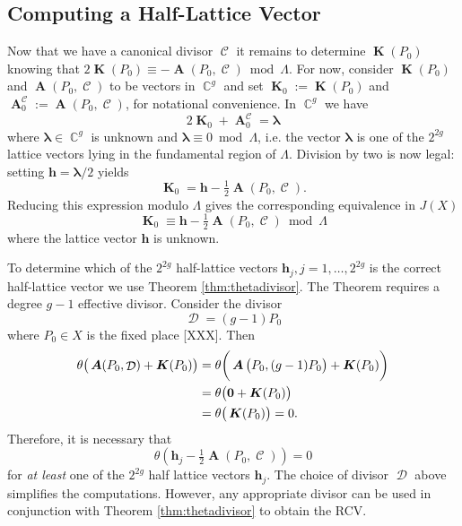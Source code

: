 \documentclass[12pt]{article}
\theoremstyle{definition}
\DeclareMathOperator{\CC}{\mathbb{C}}
\DeclareMathOperator{\DivC}{\mathcal{C}}
\DeclareMathOperator{\DivD}{\mathcal{D}}
\DeclareMathOperator{\RCV}{\boldsymbol{K}}
\DeclareMathOperator{\Abel}{\boldsymbol{A}}
\begin{document}
\subsection{Computing a Half-Lattice Vector}


Now that we have a canonical divisor $\DivC$ it remains to determine
$\RCV(P_0)$ knowing that $2\RCV(P_0) \equiv - \Abel(P_0,\DivC)
\bmod{\Lambda}$. For now, consider $\RCV(P_0)$ and $\Abel(P_0,\DivC)$ to
be vectors in $\CC^g$ and set $\RCV_0 := \RCV(P_0)$ and $\Abel_0^{\DivC}
:= \Abel(P_0,\DivC)$, for notational convenience. In $\CC^g$ we have
\begin{equation}
2\RCV_0 + \Abel_0^{\DivC} = \boldsymbol{\lambda}
\end{equation}
where $\boldsymbol{\lambda} \in \CC^g$ is unknown and
$\boldsymbol{\lambda} \equiv 0 \bmod{\Lambda}$, i.e. the vector
$\boldsymbol{\lambda}$ is one of the $2^{2g}$ lattice vectors lying in
the fundamental region of $\Lambda$. Division by two is now legal:
setting $\boldsymbol{h} = \boldsymbol{\lambda}/2$ yields
\begin{equation}
\RCV_0 = \boldsymbol{h} - \tfrac{1}{2} \Abel(P_0,\DivC).
\end{equation}
Reducing this expression modulo $\Lambda$ gives the corresponding
equivalence in $J(X)$
\begin{equation}
\RCV_0 \equiv \boldsymbol{h} - \tfrac{1}{2} \Abel(P_0,\DivC)
\bmod{\Lambda}
\end{equation}
where the lattice vector $\boldsymbol{h}$ is unknown.

To determine which of the $2^{2g}$ half-lattice vectors
$\boldsymbol{h}_j, j = 1, \ldots, 2^{2g}$ is the correct half-lattice
vector we use Theorem \ref{thm:thetadivisor}. The Theorem requires a
degree $g-1$ effective divisor. Consider the divisor
\begin{equation} \label{eqn:simple-effective-divisor}
  \DivD = (g-1)P_0
\end{equation}
where $P_0 \in X$ is the fixed place [XXX]. Then
\begin{align*}
  \theta\big(\Abel(P_0,\DivD) + \RCV(P_0)\big)
  &=
  \theta\bigg(\Abel\big(P_0,(g-1)P_0\big) + \RCV(P_0)\bigg) \notag \\
  &=
  \theta\big(\boldsymbol{0} + \RCV(P_0)\big) \notag \\
  &=
  \theta\big(\RCV(P_0)\big) = 0.
\end{align*}
Therefore, it is necessary that
\begin{equation}
  \theta\left(
  \boldsymbol{h}_j - \tfrac{1}{2} \Abel(P_0,\DivC)
  \right) = 0
\end{equation}
for {\it at least} one of the $2^{2g}$ half lattice vectors
$\boldsymbol{h}_j$. The choice of divisor $\DivD$ above simplifies the
computations. However, any appropriate divisor can be used in
conjunction with Theorem \ref{thm:thetadivisor} to obtain the RCV.
\end{document}
